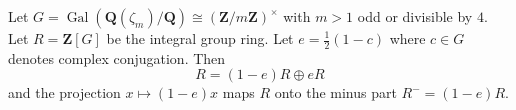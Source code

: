 Let $G = \operatorname{Gal}(\mathbf{Q}(\zeta_m)/\mathbf{Q}) \cong (\mathbf{Z}/m\mathbf{Z})^\times$ with $m > 1$ odd or divisible by $4$. Let $R = \mathbf{Z}[G]$ be the integral group ring. Let $e = \frac{1}{2}(1 - c)$ where $c \in G$ denotes complex conjugation. Then
$$R = (1-e)R \oplus eR$$
and the projection $x \mapsto (1-e)x$ maps $R$ onto the minus part $R^- = (1-e)R$.
